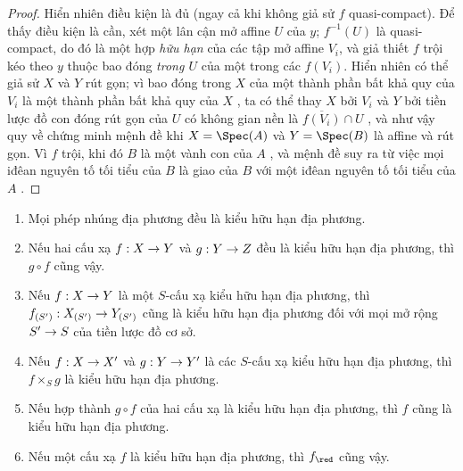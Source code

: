 \documentclass[oneside]{amsart}
\makeatletter
\newcommand{\ega@arrow}[2]{\mathchoice{#1}{#2}{#2}{#2}}
\renewcommand{\to}{\ega@arrow{\longrightarrow}{\rightarrow}}
\let\EGAOriginalLabel\label
\renewcommand{\label}[1]{\phantomsection\EGAOriginalLabel{#1}}
\makeatother
\begin{document}
\begin{proof}
Hiển nhiên điều kiện là đủ (ngay cả khi không giả sử $f$ quasi-compact).
Để thấy điều kiện là cần, xét một lân cận mở affine $U$ của $y$;
$f^{-1}(U)$ là quasi-compact, do đó là một hợp \emph{hữu hạn} của các tập mở affine $V_i$, và giả thiết $f$ trội kéo theo $y$ thuộc bao đóng \emph{trong $U$} của một trong các $f(V_i)$.
Hiển nhiên có thể giả sử $X$ và $Y$ rút gọn;
vì bao đóng trong $X$ của một thành phần bất khả quy của $V_i$ là một thành phần bất khả quy của $X$ , ta có thể thay $X$ bởi $V_i$ và $Y$ bởi tiền lược đồ con đóng rút gọn của $U$ có không gian nền là $\overline{f(V_i)}\cap U$ , và như vậy quy về chứng minh mệnh đề khi $X=\Spec(A)$ và $Y=\Spec(B)$ là affine và rút gọn.
Vì $f$ trội, khi đó $B$ là một vành con của $A$ , và mệnh đề suy ra từ việc mọi iđêan nguyên tố tối tiểu của $B$ là giao của $B$ với một iđêan nguyên tố tối tiểu của $A$ .
\end{proof}

\begin{proposition}[6.6.6]
\label{I.6.6.6}
\medskip\noindent
\begin{enumerate}
  \item[{\rm(i)}] Mọi phép nhúng địa phương đều là kiểu hữu hạn địa phương.
  \item[{\rm(ii)}] Nếu hai cấu xạ $f:X\to Y$ và $g:Y\to Z$ đều là kiểu hữu hạn địa phương, thì $g\circ f$ cũng vậy.
  \item[{\rm(iii)}] Nếu $f:X\to Y$ là một $S$-cấu xạ kiểu hữu hạn địa phương, thì $f_{(S')}:X_{(S')}\to Y_{(S')}$ cũng là kiểu hữu hạn địa phương đối với mọi mở rộng $S'\to S$ của tiền lược đồ cơ sở.
  \item[{\rm(iv)}] Nếu $f:X\to X'$ và $g:Y\to Y'$ là các $S$-cấu xạ kiểu hữu hạn địa phương, thì $f\times_S g$ là kiểu hữu hạn địa phương.
  \item[{\rm(v)}] Nếu hợp thành $g\circ f$ của hai cấu xạ là kiểu hữu hạn địa phương, thì $f$ cũng là kiểu hữu hạn địa phương.
  \item[{\rm(vi)}] Nếu một cấu xạ $f$ là kiểu hữu hạn địa phương, thì $f_\red$ cũng vậy.
\end{enumerate}
\end{proposition}
\end{document}

